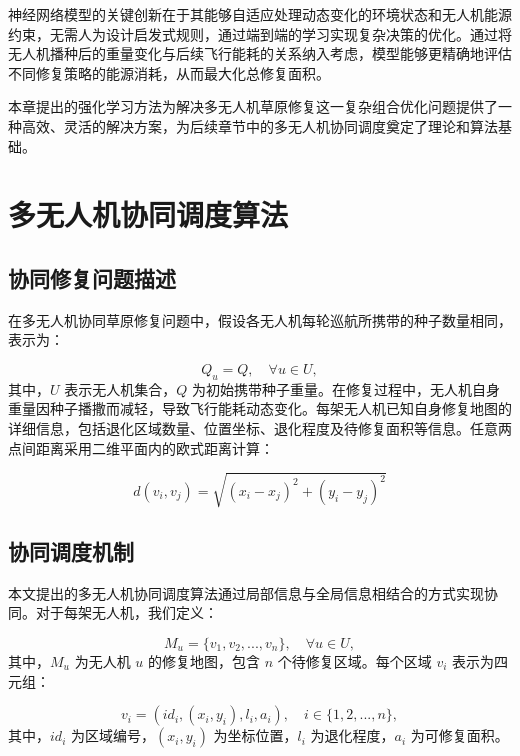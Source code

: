 \documentclass[AutoFakeBold]{LZUThesis}
\begin{document}
神经网络模型的关键创新在于其能够自适应处理动态变化的环境状态和无人机能源约束，无需人为设计启发式规则，通过端到端的学习实现复杂决策的优化。通过将无人机播种后的重量变化与后续飞行能耗的关系纳入考虑，模型能够更精确地评估不同修复策略的能源消耗，从而最大化总修复面积。

本章提出的强化学习方法为解决多无人机草原修复这一复杂组合优化问题提供了一种高效、灵活的解决方案，为后续章节中的多无人机协同调度奠定了理论和算法基础。

\chapter{多无人机协同调度算法}

\section{协同修复问题描述}

在多无人机协同草原修复问题中，假设各无人机每轮巡航所携带的种子数量相同，表示为：

\begin{equation}
	Q_u = Q, \quad \forall u \in U,
\end{equation}
其中，$U$ 表示无人机集合，$Q$ 为初始携带种子重量。在修复过程中，无人机自身重量因种子播撒而减轻，导致飞行能耗动态变化。每架无人机已知自身修复地图的详细信息，包括退化区域数量、位置坐标、退化程度及待修复面积等信息。任意两点间距离采用二维平面内的欧式距离计算：

\begin{equation}
	d(v_i, v_j) = \sqrt{(x_i - x_j)^2 + (y_i - y_j)^2}
\end{equation}

\section{协同调度机制}

本文提出的多无人机协同调度算法通过局部信息与全局信息相结合的方式实现协同。对于每架无人机，我们定义：

\begin{equation}
	M_u = \{v_1, v_2, ..., v_n\}, \quad \forall u \in U,
\end{equation}
其中，$M_u$ 为无人机 $u$ 的修复地图，包含 $n$ 个待修复区域。每个区域 $v_i$ 表示为四元组：

\begin{equation}
	v_i = (id_i, (x_i, y_i), l_i, a_i), \quad i \in \{1,2,...,n\},
\end{equation}
其中，$id_i$ 为区域编号，$(x_i, y_i)$ 为坐标位置，$l_i$ 为退化程度，$a_i$ 为可修复面积。
\end{document}
